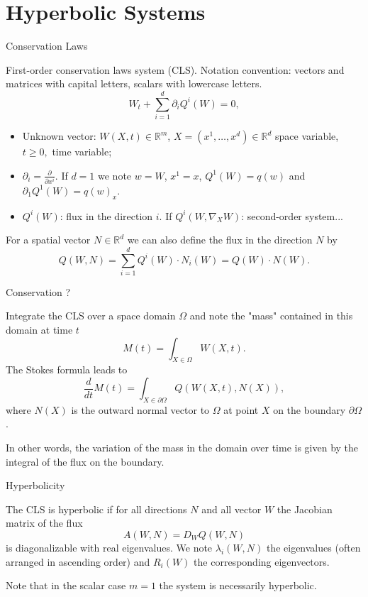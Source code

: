 \documentclass[english]{beamer}
\begin{document}
 \section{Hyperbolic Systems}
\begin{frame}{Conservation Laws}

First-order conservation laws system (CLS). Notation convention:  vectors and matrices with
capital letters, scalars with lowercase letters.
\[
W_{t}+\sum_{i=1}^{d}\partial_{i}Q^{i}(W)=0,
\]

\begin{itemize}
\item Unknown vector: $W(X,t)\in\mathbb{R}^{m}$, $X=(x^{1},\ldots,x^{d})\in\mathbb{R}^{d}$ space variable, $t\geq0,$ time variable;
\item $\partial_{i}=\frac{\partial}{\partial x^{i}}$. If $d=1$ we note
$w=W$, $x^{1}=x$, $Q^{1}(W)=q(w)$ and $\partial_{1}Q^{1}(W)=q(w)_{x}$.

\item $Q^{i}(W)$: flux in the direction $i$. If $Q^{i}(W,\nabla_{X}W)$: second-order system...
\end{itemize}
For a spatial vector $N\in\mathbb{R}^{d}$ we can also define
the flux in the direction $N$ by
\[
Q(W,N)=\sum_{i=1}^{d}Q^{i}(W)\cdot N_{i}(W)=Q(W)\cdot N(W).
\]

\end{frame}
%
\begin{frame}{Conservation ?}

Integrate the CLS over a space domain $\Omega$ and note the "mass"
contained in this domain at time $t$
\[
M(t)=\int_{X\in\Omega}W(X,t).
\]
The Stokes formula leads to
\[
\frac{d}{dt}M(t)=\int_{X\in\partial\Omega}Q(W(X,t),N(X)),
\]
where $N(X)$ is the outward normal vector to $\Omega$ at point $X$
on the boundary $\partial\Omega$.

In other words, the variation of the mass in the domain over time is given by
the integral of the flux on the boundary.

\end{frame}
%

\begin{frame}{Hyperbolicity}

The CLS is hyperbolic if for all directions $N$ and all vector
$W$ the Jacobian matrix of the flux
\[
A(W,N)=D_{W}Q(W,N)
\]
is diagonalizable with real eigenvalues. We note $\lambda_{i}(W,N)$
the eigenvalues (often arranged in ascending order) and $R_{i}(W)$
the corresponding eigenvectors.

Note that in the scalar case $m=1$ the system is necessarily hyperbolic.
\end{frame}
%
\end{document}
